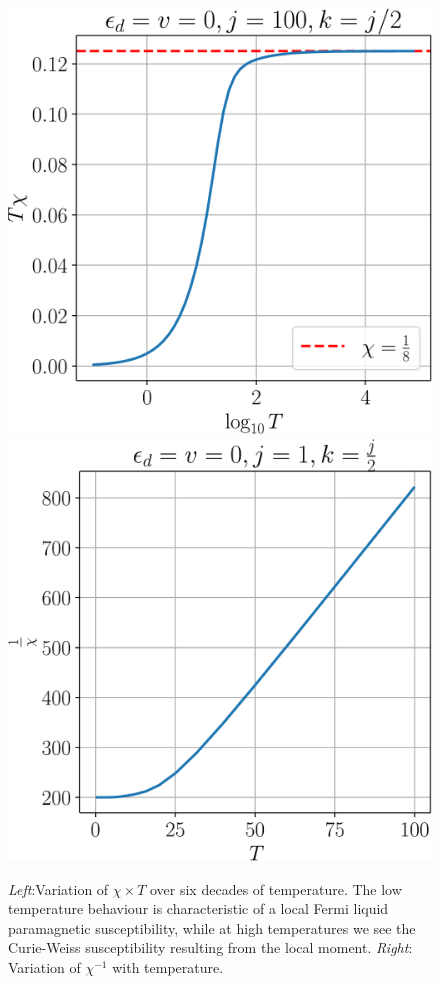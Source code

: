 \documentclass[12pt,twoside]{article}
\numberwithin{equation}{section}
\begin{document}
\begin{figure}[htpb!]
	\centering
	\includegraphics[scale=0.39]{../figures/chi_T.pdf}
	\includegraphics[scale=0.39]{../figures/one_over_chi.pdf}
	\caption{\textit{Left}:Variation of $\chi \times T$ over six decades of temperature. The low temperature behaviour is characteristic of a local Fermi liquid paramagnetic susceptibility, while at high temperatures we see the Curie-Weiss susceptibility resulting from the local moment. \textit{Right}: Variation of \(\chi^{-1}\) with temperature.}
\end{figure}
\end{document}
